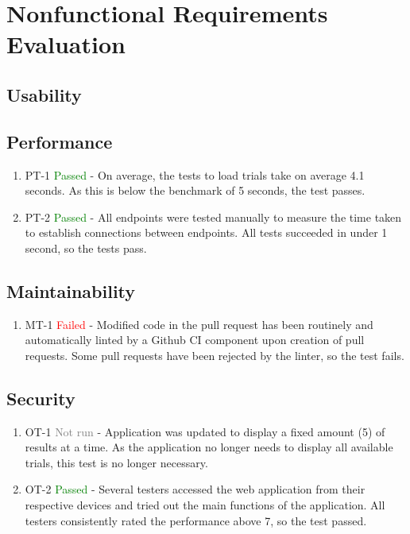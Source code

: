 \documentclass[12pt, titlepage]{article}
\begin{document}
\section{Nonfunctional Requirements Evaluation}

\subsection{Usability}
		
\subsection{Performance}
\begin{enumerate}
  \item PT-1 \textcolor{green}{Passed} - On average, the tests to load trials take on average 4.1 seconds. As this is below the benchmark of 5 seconds, the test passes.
\item PT-2 \textcolor{green}{Passed} - All endpoints were tested manually to measure the time taken to establish connections between endpoints. All tests succeeded in under 1 second, so the tests pass.
\end{enumerate}

\subsection{Maintainability}
\begin{enumerate}
  \item MT-1 \textcolor{red}{Failed} - Modified code in the pull request has been routinely and automatically linted by a Github CI component upon creation of pull requests. Some pull requests have been rejected by the linter, so the test fails.
\end{enumerate}

\subsection{Security}
\begin{enumerate}
  \item OT-1 \textcolor{gray}{Not run} - Application was updated to display a fixed amount (5) of results at a time. As the application no longer needs to display all available trials, this test is no longer necessary.  
\item OT-2 \textcolor{green}{Passed} - Several testers accessed the web application from their respective devices and tried out the main functions of the application. All testers consistently rated the performance above 7, so the test passed.
\end{enumerate}
\end{document}
